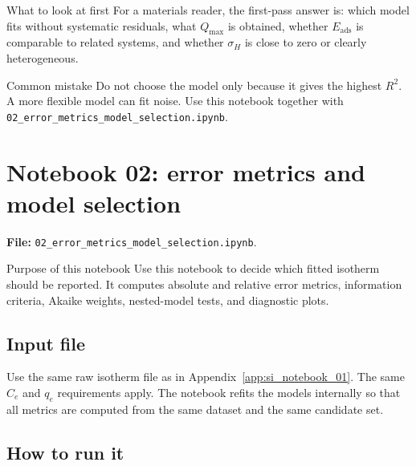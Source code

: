 \documentclass[journal=jacsat,manuscript=article]{achemso}
\begin{document}
\begin{greenbox}{What to look at first}
	For a materials reader, the first-pass answer is: which model fits
	without systematic residuals, what \(Q_{\max}\) is obtained, whether
	\(E_{\mathrm{ads}}\) is comparable to related systems, and whether
	\(\sigma_H\) is close to zero or clearly heterogeneous.
\end{greenbox}

\begin{redbox}{Common mistake}
	Do not choose the model only because it gives the highest \(R^2\). A
	more flexible model can fit noise. Use this notebook together with
	\texttt{02\_error\_metrics\_model\_selection.ipynb}.
\end{redbox}

\section{Notebook 02: error metrics and model selection}
\label{app:si_notebook_02}

\noindent\textbf{File:} \texttt{02\_error\_metrics\_model\_selection.ipynb}.

\begin{bluebox}{Purpose of this notebook}
	Use this notebook to decide which fitted isotherm should be reported.
	It computes absolute and relative error metrics, information criteria,
	Akaike weights, nested-model tests, and diagnostic plots.
\end{bluebox}

\subsection*{Input file}

Use the same raw isotherm file as in Appendix~\ref{app:si_notebook_01}.
The same \(C_e\) and \(q_e\) requirements apply. The notebook refits the
models internally so that all metrics are computed from the same dataset and
the same candidate set.

\subsection*{How to run it}

\end{document}
